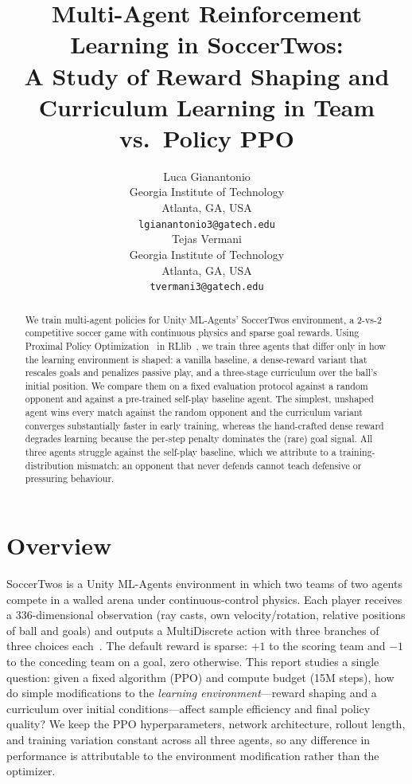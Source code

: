 \documentclass{article}
\title{Multi-Agent Reinforcement Learning in SoccerTwos:\\
A Study of Reward Shaping and Curriculum Learning in Team vs.\ Policy PPO}
\author{
  Luca Gianantonio\\
  Georgia Institute of Technology\\
  Atlanta, GA, USA\\
  \texttt{lgianantonio3@gatech.edu} \\
  \And
  Tejas Vermani\\
  Georgia Institute of Technology\\
  Atlanta, GA, USA\\
  \texttt{tvermani3@gatech.edu} \\
}
\begin{document}
\maketitle


\begin{abstract}
We train multi-agent policies for Unity ML-Agents' SoccerTwos environment, a 2-vs-2 competitive soccer game with continuous physics and sparse goal rewards.
Using Proximal Policy Optimization~\citep{schulman2017proximal} in RLlib~\citep{liang2018rllib}, we train three agents that differ only in how the learning environment is shaped: a vanilla baseline, a dense-reward variant that rescales goals and penalizes passive play, and a three-stage curriculum over the ball's initial position.
We compare them on a fixed evaluation protocol against a random opponent and against a pre-trained self-play baseline agent.
The simplest, unshaped agent wins every match against the random opponent and the curriculum variant converges substantially faster in early training, whereas the hand-crafted dense reward degrades learning because the per-step penalty dominates the (rare) goal signal.
All three agents struggle against the self-play baseline, which we attribute to a training-distribution mismatch: an opponent that never defends cannot teach defensive or pressuring behaviour.
\end{abstract}



\section{Overview}

SoccerTwos is a Unity ML-Agents environment in which two teams of two agents compete in a walled arena under continuous-control physics.
Each player receives a 336-dimensional observation (ray casts, own velocity/rotation, relative positions of ball and goals) and outputs a MultiDiscrete action with three branches of three choices each~\citep{bryanoliveira_soccer_twos}.
The default reward is sparse: $+1$ to the scoring team and $-1$ to the conceding team on a goal, zero otherwise.
This report studies a single question: given a fixed algorithm (PPO) and compute budget (15M steps), how do simple modifications to the \emph{learning environment}---reward shaping and a curriculum over initial conditions---affect sample efficiency and final policy quality?
We keep the PPO hyperparameters, network architecture, rollout length, and training variation constant across all three agents, so any difference in performance is attributable to the environment modification rather than the optimizer.
\end{document}

